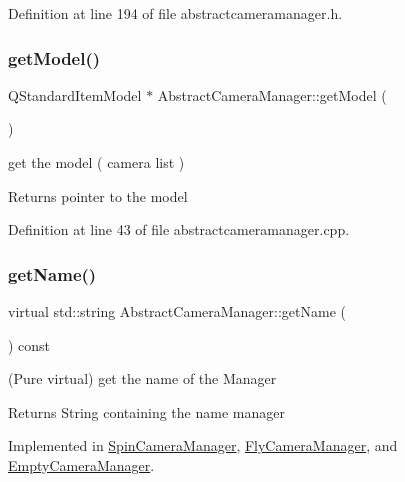 Definition at line 194 of file abstractcameramanager.\+h.

\mbox{\label{class_abstract_camera_manager_a02097102061955f0092969a6cf812823}} 
\subsubsection{\texorpdfstring{getModel()}{getModel()}}
{\footnotesize\ttfamily Q\+Standard\+Item\+Model $\ast$ Abstract\+Camera\+Manager\+::get\+Model (\begin{DoxyParamCaption}{ }\end{DoxyParamCaption})}



get the model ( camera list ) 

\begin{DoxyReturn}{Returns}
pointer to the model 
\end{DoxyReturn}


Definition at line 43 of file abstractcameramanager.\+cpp.

\mbox{\label{class_abstract_camera_manager_a6e4b041842471b9ed42ddd5c9ab260d1}} 
\subsubsection{\texorpdfstring{getName()}{getName()}}
{\footnotesize\ttfamily virtual std\+::string Abstract\+Camera\+Manager\+::get\+Name (\begin{DoxyParamCaption}{ }\end{DoxyParamCaption}) const\hspace{0.3cm}{\ttfamily [pure virtual]}}



(Pure virtual) get the name of the Manager 

\begin{DoxyReturn}{Returns}
String containing the name manager 
\end{DoxyReturn}


Implemented in \mbox{\hyperlink{class_spin_camera_manager_ac3ea32324ae75d80e9b1e3108ee9c6d2}{Spin\+Camera\+Manager}}, \mbox{\hyperlink{class_fly_camera_manager_a4e368cea1f4cedf26b653518c75c1433}{Fly\+Camera\+Manager}}, and \mbox{\hyperlink{class_empty_camera_manager_a9956650ba2c7ec4d18029c896311ac8e}{Empty\+Camera\+Manager}}.

